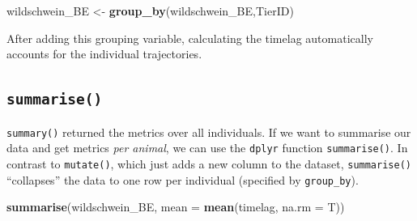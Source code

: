 \documentclass[]{book}
\newenvironment{Shaded}{\begin{snugshade}}{\end{snugshade}}
\newcommand{\CommentTok}[1]{\textcolor[rgb]{0.56,0.35,0.01}{\textit{#1}}}
\newcommand{\DataTypeTok}[1]{\textcolor[rgb]{0.13,0.29,0.53}{#1}}
\newcommand{\KeywordTok}[1]{\textcolor[rgb]{0.13,0.29,0.53}{\textbf{#1}}}
\newcommand{\NormalTok}[1]{#1}
\newcommand{\OperatorTok}[1]{\textcolor[rgb]{0.81,0.36,0.00}{\textbf{#1}}}
\newcommand{\StringTok}[1]{\textcolor[rgb]{0.31,0.60,0.02}{#1}}
\begin{document}
\begin{Shaded}
\begin{Highlighting}[]
\NormalTok{wildschwein_BE <-}\StringTok{ }\KeywordTok{group_by}\NormalTok{(wildschwein_BE,TierID)}
\end{Highlighting}
\end{Shaded}

After adding this grouping variable, calculating the timelag automatically accounts for the individual trajectories.

\begin{Shaded}
\end{Shaded}

\hypertarget{summarise}{%
\subsection{\texorpdfstring{\texttt{summarise()}}{summarise()}}\label{summarise}}

\texttt{summary()} returned the metrics over all individuals. If we want to summarise our data and get metrics \emph{per animal}, we can use the \texttt{dplyr} function \texttt{summarise()}. In contrast to \texttt{mutate()}, which just adds a new column to the dataset, \texttt{summarise()} ``collapses'' the data to one row per individual (specified by \texttt{group\_by}).

\begin{Shaded}
\begin{Highlighting}[]
\KeywordTok{summarise}\NormalTok{(wildschwein_BE, }\DataTypeTok{mean =} \KeywordTok{mean}\NormalTok{(timelag, }\DataTypeTok{na.rm =}\NormalTok{ T))}
\end{Highlighting}
\end{Shaded}
\end{document}
